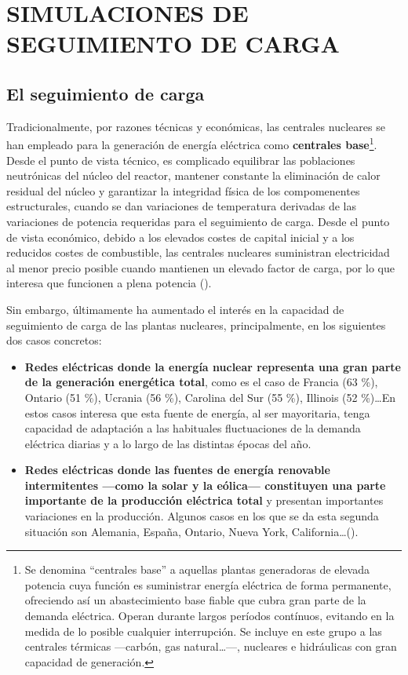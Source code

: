 \newpage
\section{SIMULACIONES DE SEGUIMIENTO DE CARGA} \label{simulaciones_seguimiento_de_carga}

\subsection{El seguimiento de carga} \label{seguimiento_de_carga}

Tradicionalmente, por razones técnicas y económicas, las centrales nucleares se han empleado para la generación de energía eléctrica como \textbf{centrales base}\footnote{Se denomina ``centrales base'' a aquellas plantas generadoras de elevada potencia cuya función es suministrar energía eléctrica de forma permanente, ofreciendo así un abastecimiento base fiable que cubra gran parte de la demanda eléctrica. Operan durante largos períodos contínuos, evitando en la medida de lo posible cualquier interrupción. Se incluye en este grupo a las centrales térmicas ---carbón, gas natural\dots---, nucleares e hidráulicas con gran capacidad de generación.}. Desde el punto de vista técnico, es complicado equilibrar las poblaciones neutrónicas del núcleo del reactor, mantener constante la eliminación de calor residual del núcleo y garantizar la integridad física de los compomenentes estructurales, cuando se dan variaciones de temperatura derivadas de las variaciones de potencia requeridas para el seguimiento de carga. Desde el punto de vista económico, debido a los elevados costes de capital inicial y a los reducidos costes de combustible, las centrales nucleares suministran electricidad al menor precio posible cuando mantienen un elevado \gls{factor de carga}, por lo que interesa que funcionen a plena potencia (\cite{stanford_load_following}).

Sin embargo, últimamente ha aumentado el interés en la capacidad de seguimiento de carga de las plantas nucleares, principalmente, en los siguientes dos casos concretos:

\begin{itemize}
  \item \textbf{Redes eléctricas donde la energía nuclear representa una gran parte de la generación energética total}, como es el caso de Francia (63 \%), Ontario (51 \%), Ucrania (56 \%), Carolina del Sur (55 \%), Illinois (52 \%)\dots  En estos casos interesa que esta fuente de energía, al ser mayoritaria, tenga capacidad de adaptación a las habituales fluctuaciones de la demanda eléctrica diarias y a lo largo de las distintas épocas del año.
  \item \textbf{Redes eléctricas donde las fuentes de energía renovable intermitentes ---como la solar y la eólica--- constituyen una parte importante de la producción eléctrica total} y presentan importantes variaciones en la producción. Algunos casos en los que se da esta segunda situación son Alemania, España, Ontario, Nueva York, California\dots (\cite{ANS_2019}).
\end{itemize} 

